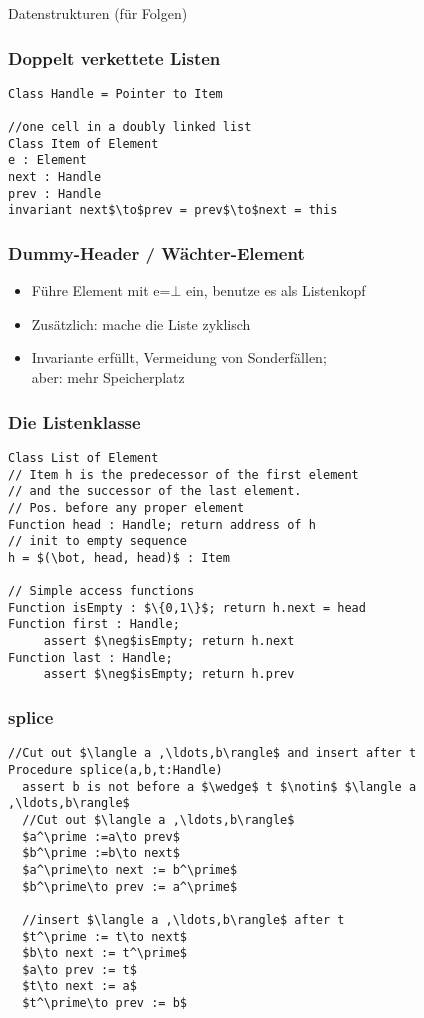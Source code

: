 \begin{frame}
Datenstrukturen (für Folgen)
\end{frame}

\begin{frame}[fragile]
\frametitle{Doppelt verkettete Listen}
\begin{lstlisting}
Class Handle = Pointer to Item

//one cell in a doubly linked list
Class Item of Element
e : Element
next : Handle
prev : Handle
invariant next$\to$prev = prev$\to$next = this
\end{lstlisting}
\end{frame}

\begin{frame}
\frametitle{Dummy-Header / Wächter-Element}
\begin{itemize}
\item Führe Element mit e=$\bot$ ein, benutze es als Listenkopf
\item Zusätzlich: mache die Liste zyklisch\pause
\item Invariante erfüllt, Vermeidung von Sonderfällen;\\ aber: mehr Speicherplatz
\end{itemize}
\end{frame}

\begin{frame}[fragile]
\frametitle{Die Listenklasse}
\begin{lstlisting}
Class List of Element
// Item h is the predecessor of the first element
// and the successor of the last element.
// Pos. before any proper element
Function head : Handle; return address of h
// init to empty sequence
h = $(\bot, head, head)$ : Item

// Simple access functions
Function isEmpty : $\{0,1\}$; return h.next = head
Function first : Handle; 
     assert $\neg$isEmpty; return h.next
Function last : Handle;
     assert $\neg$isEmpty; return h.prev
\end{lstlisting}
\end{frame}

\begin{frame}[fragile]
\frametitle{splice}
\begin{lstlisting}
//Cut out $\langle a ,\ldots,b\rangle$ and insert after t
Procedure splice(a,b,t:Handle)
  assert b is not before a $\wedge$ t $\notin$ $\langle a ,\ldots,b\rangle$
  //Cut out $\langle a ,\ldots,b\rangle$
  $a^\prime :=a\to prev$
  $b^\prime :=b\to next$
  $a^\prime\to next := b^\prime$
  $b^\prime\to prev := a^\prime$

  //insert $\langle a ,\ldots,b\rangle$ after t
  $t^\prime := t\to next$
  $b\to next := t^\prime$
  $a\to prev := t$
  $t\to next := a$
  $t^\prime\to prev := b$
\end{lstlisting}
\end{frame}

